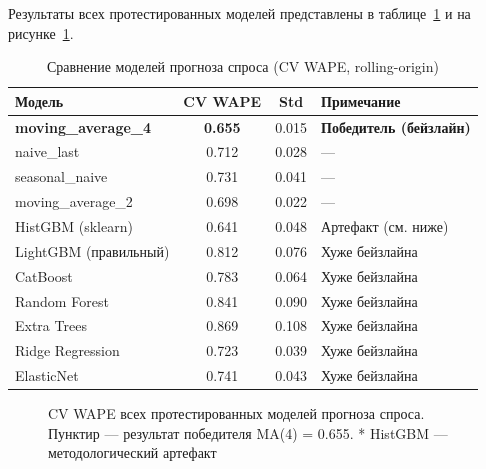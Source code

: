 Результаты всех протестированных моделей представлены в таблице~\ref{tab:demand_experiments} и на рисунке~\ref{fig:model_comparison_chart}.

\begin{table}[H]
\centering
\caption{Сравнение моделей прогноза спроса (CV WAPE, rolling-origin)}
\label{tab:demand_experiments}
\begin{tabular}{lccl}
\toprule
\textbf{Модель} & \textbf{CV WAPE} & \textbf{Std} & \textbf{Примечание} \\
\midrule
\textbf{moving\_average\_4} & \textbf{0.655} & 0.015 & \textbf{Победитель (бейзлайн)} \\
naive\_last & 0.712 & 0.028 & --- \\
seasonal\_naive & 0.731 & 0.041 & --- \\
moving\_average\_2 & 0.698 & 0.022 & --- \\
\midrule
HistGBM (sklearn) & 0.641 & 0.048 & Артефакт (см. ниже) \\
LightGBM (правильный) & 0.812 & 0.076 & Хуже бейзлайна \\
CatBoost & 0.783 & 0.064 & Хуже бейзлайна \\
Random Forest & 0.841 & 0.090 & Хуже бейзлайна \\
Extra Trees & 0.869 & 0.108 & Хуже бейзлайна \\
Ridge Regression & 0.723 & 0.039 & Хуже бейзлайна \\
ElasticNet & 0.741 & 0.043 & Хуже бейзлайна \\
\bottomrule
\end{tabular}
\end{table}

\begin{figure}[H]
\centering
{}
\caption{CV WAPE всех протестированных моделей прогноза спроса. Пунктир --- результат победителя MA(4) = 0.655. * HistGBM --- методологический артефакт}
\label{fig:model_comparison_chart}
\end{figure}

